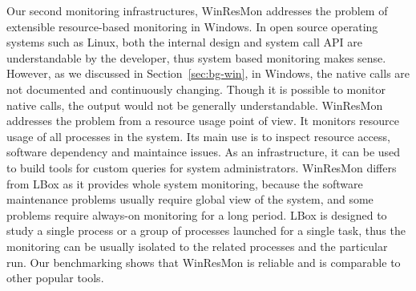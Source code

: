 Our second monitoring infrastructures, WinResMon addresses the problem
of extensible resource-based monitoring in Windows.
In open source operating systems such as Linux,
both the internal design and system call API are understandable by
the developer, thus system based monitoring makes sense.
However, as we discussed in Section~\ref{sec:bg-win},
in Windows, the native calls are not documented and continuously
changing.
Though it is possible to monitor native calls, the output would not be
generally understandable.
WinResMon addresses the problem from a resource usage point of view.
It monitors resource usage of all processes in the system.
Its main use is to inspect resource access, software dependency and
maintaince issues.
As an infrastructure, it can be used to build tools for custom queries
for system administrators.
WinResMon differs from LBox as it provides whole system monitoring,
because the software maintenance problems usually require global view
of the system,
and some problems require always-on monitoring for a long period.
LBox is designed to study a single process or a group of processes launched
for a single task, thus
the monitoring can be usually isolated to the related processes and
the particular run.
Our benchmarking shows that WinResMon is reliable and is
comparable to other popular tools.
